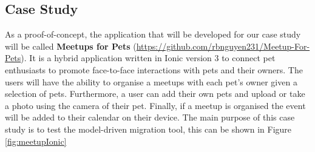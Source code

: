 \documentclass[conference]{IEEEtran}
\begin{document}
\subsection{Case Study}
As a proof-of-concept, the application that will be developed for our case study will be called \textbf{Meetups for Pets} (\url{https://github.com/rbnguyen231/Meetup-For-Pets}). It is a hybrid application written
in Ionic version 3 to connect pet enthusiasts to promote face-to-face interactions with pets and their owners. The users will have the ability to organise a
meetups with each pet’s owner given a selection of pets. Furthermore, a user can add their own pets and upload or take a photo using the camera of their pet. Finally,
if a meetup is organised the event will be added to their calendar on their device. The main purpose of this case study is to test the model-driven migration tool, this can be shown in Figure \ref{fig:meetupIonic}
\end{document}
